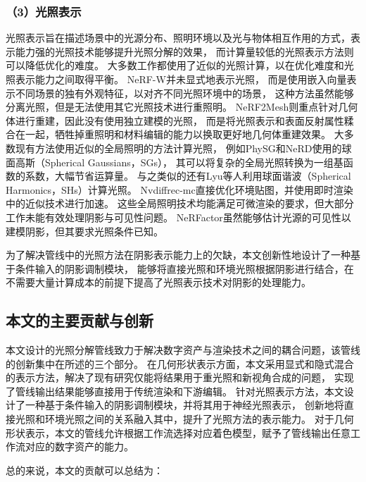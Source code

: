\subsubsection*{（3）光照表示}

光照表示旨在描述场景中的光源分布、照明环境以及光与物体相互作用的方式，表示能力强的光照技术能够提升光照分解的效果，
而计算量较低的光照表示方法则可以降低优化的难度。
大多数工作都使用了近似的光照计算，以在优化难度和光照表示能力之间取得平衡。
NeRF-W\cite{martinbrualla2020nerfw}并未显式地表示光照，
而是使用嵌入向量表示不同场景的独有外观特征，以对齐不同光照环境中的场景，
这种方法虽然能够分离光照，但是无法使用其它光照技术进行重照明。
NeRF2Mesh\cite{Tang_2023}则重点针对几何体进行重建，因此没有使用独立建模的光照，
而是将光照表示和表面反射属性糅合在一起，牺牲掉重照明和材料编辑的能力以换取更好地几何体重建效果。
大多数现有方法使用近似的全局照明的方法计算光照，
例如PhySG\cite{Zhang_2021}和NeRD\cite{Boss_2021}使用的球面高斯（Spherical Gaussians，SGs），
其可以将复杂的全局光照转换为一组基函数的系数，大幅节省运算量。
与之类似的还有Lyu等人\cite{kuang2022neroic}利用球面谐波（Spherical Harmonics，SHs）计算光照。
Nvdiffrec-mc\cite{10.5555/3600270.3601931}直接优化环境贴图，并使用即时渲染中的近似技术进行加速。
这些全局照明技术均能满足可微渲染的要求，但大部分工作未能有效处理阴影与可见性问题。
NeRFactor\cite{zhang2021nerfactor}虽然能够估计光源的可见性以建模阴影，但其要求光照条件已知。

为了解决管线中的光照方法在阴影表示能力上的欠缺，本文创新性地设计了一种基于条件输入的阴影调制模块，
能够将直接光照和环境光照根据阴影进行结合，在不需要大量计算成本的前提下提高了光照表示技术对阴影的处理能力。

\subsection{本文的主要贡献与创新}

本文设计的光照分解管线致力于解决数字资产与渲染技术之间的耦合问题，该管线的创新集中在\label{sec:light_decomposition}所述的三个部分。
在几何形状表示方面，本文采用显式和隐式混合的表示方法，解决了现有研究仅能将结果用于重光照和新视角合成的问题，
实现了管线输出结果能够直接用于传统渲染和下游编辑。
针对光照表示方法，本文设计了一种基于条件输入的阴影调制模块，并将其用于神经光照表示，
创新地将直接光照和环境光照之间的关系融入其中，提升了光照方法的表示能力。
对于几何形状表示，本文的管线允许根据工作流选择对应着色模型，赋予了管线输出任意工作流对应的数字资产的能力。

总的来说，本文的贡献可以总结为：

